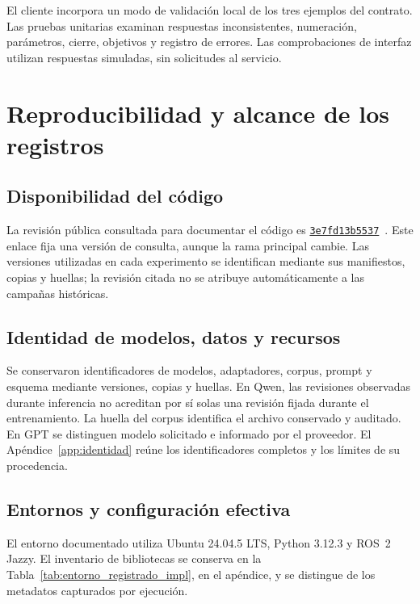 El cliente incorpora un modo de validación local de los tres ejemplos
del contrato. Las pruebas unitarias examinan respuestas inconsistentes,
numeración, parámetros, cierre, objetivos y registro de errores.
Las comprobaciones de interfaz utilizan respuestas simuladas, sin
solicitudes al servicio.

\section{Reproducibilidad y alcance de los registros}
\label{sec:reproducibilidad_impl}

\subsection{Disponibilidad del código}

La revisión pública consultada para documentar el código es \href{https://github.com/Biorobotica-UNAM/qwen/tree/3e7fd13b55375d9e776d7a1352673ecf06e45b2a}{\texttt{3e7fd13b5537}}~\cite{repositorio_qwen_tesis}. Este enlace fija una versión de consulta, aunque la rama principal cambie. Las versiones utilizadas en cada experimento se identifican mediante sus manifiestos, copias y huellas; la revisión citada no se atribuye automáticamente a las campañas históricas.

\subsection{Identidad de modelos, datos y recursos}

Se conservaron identificadores de modelos, adaptadores, corpus, prompt y esquema mediante versiones, copias y huellas. En Qwen, las revisiones observadas durante inferencia no acreditan por sí solas una revisión fijada durante el entrenamiento. La huella del corpus identifica el archivo conservado y auditado. En GPT se distinguen modelo solicitado e informado por el proveedor. El Apéndice~\ref{app:identidad} reúne los identificadores completos y los límites de su procedencia.

\subsection{Entornos y configuración efectiva}

El entorno documentado utiliza Ubuntu 24.04.5 LTS, Python 3.12.3 y ROS~2 Jazzy. El inventario de bibliotecas se conserva en la Tabla~\ref{tab:entorno_registrado_impl}, en el apéndice, y se distingue de los metadatos capturados por ejecución.

